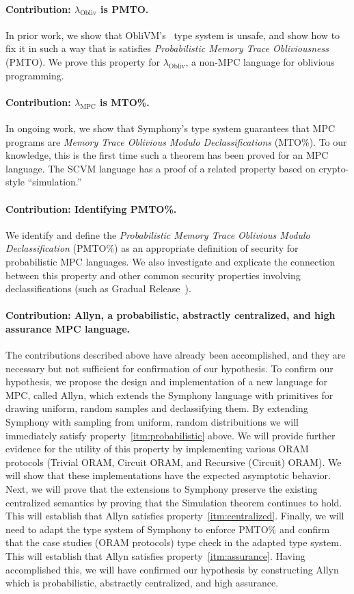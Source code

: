 \documentclass{report}
\newcommand{\lang}{Allyn\xspace}
\newcommand{\mpc}{\ensuremath{\lambda_{\mathrm{MPC}}}\xspace}
\newcommand{\obliv}{\ensuremath{\lambda_{\mathrm{Obliv}}}\xspace}
\begin{document}
\paragraph{Contribution: \obliv is PMTO.} In prior work, we show that ObliVM's~\cite{} type system is unsafe, and show how to fix it in
such a way that is satisfies \emph{Probabilistic Memory Trace Obliviousness} (PMTO). We prove this property for \obliv, a non-MPC language
for oblivious programming.

\paragraph{Contribution: \mpc is MTO\%.} In ongoing work, we show that Symphony's type system guarantees that MPC programs are
\emph{Memory Trace Oblivious Modulo Declassifications} (MTO\%). To our knowledge, this is the first time such a theorem has been
proved for an MPC language. The SCVM language has a proof of a related property based on crypto-style ``simulation.''

\paragraph{Contribution: Identifying PMTO\%.} We identify and define the \emph{Probabilistic Memory Trace Oblivious Modulo Declassification}
(PMTO\%) as an appropriate definition of security for probabilistic MPC languages. We also investigate and explicate the connection between
this property and other common security properties involving declassifications (such as Gradual Release~\cite{}).

\paragraph{Contribution: \lang, a probabilistic, abstractly centralized, and high assurance MPC language.} The contributions described
above have already been accomplished, and they are necessary but not sufficient for confirmation of our
hypothesis. To confirm our hypothesis, we propose the design and implementation of a new language for MPC, called \lang, which extends
the Symphony language with primitives for drawing uniform, random samples and declassifying them. By extending Symphony with sampling
from uniform, random distribuitions we will immediately satisfy property~\ref{itm:probabilistic} above. We will provide further evidence
for the utility of this property by implementing various ORAM protocols (Trivial ORAM, Circuit ORAM, and Recursive (Circuit) ORAM). We will
show that these implementations have the expected asymptotic behavior. Next, we will prove that the extensions to Symphony preserve the
existing centralized semantics by proving that the Simulation theorem continues to hold. This will establish that \lang satisfies
property~\ref{itm:centralized}. Finally, we will need to adapt the type system of Symphony to enforce PMTO\% and confirm that the case studies
(ORAM protocols) type check in the adapted type system. This will establish that \lang satisfies property~\ref{itm:assurance}. Having
accomplished this, we will have confirmed our hypothesis by constructing \lang which is probabilistic, abstractly centralized, and
high assurance.
\end{document}
